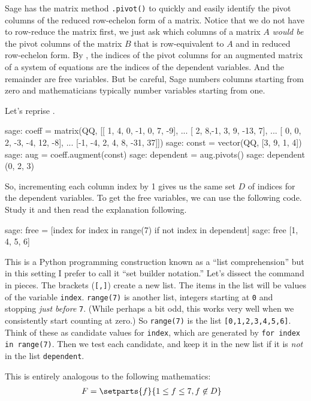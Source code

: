 Sage has the matrix method \verb?.pivot()? to quickly and easily identify the pivot columns of the reduced row-echelon form of a matrix.  Notice that we do not have to row-reduce the matrix first, we just ask which columns of a matrix $A$ \emph{would be} the pivot columns of the matrix $B$ that is row-equivalent to $A$ and in reduced row-echelon form.  By , the indices of the pivot columns for an augmented matrix of a system of equations are the indices of the dependent variables.  And the remainder are free variables.  But be careful, Sage numbers columns starting from zero and mathematicians typically number variables starting from one.\par
%
Let's reprise .
%
\begin{sageexample}
sage: coeff = matrix(QQ, [[ 1,  4, 0, -1,  0,   7, -9],
...                       [ 2,  8,-1,  3,  9, -13,  7],
...                       [ 0,  0, 2, -3, -4,  12, -8],
...                       [-1, -4, 2,  4,  8, -31, 37]])
sage: const = vector(QQ, [3, 9, 1, 4])
sage: aug = coeff.augment(const)
sage: dependent = aug.pivots()
sage: dependent
(0, 2, 3)
\end{sageexample}
%
So, incrementing each column index by 1 gives us the same set $D$ of indices for the dependent variables.  To get the free variables, we can use the following code.  Study it and then read the explanation following.
%
\begin{sageexample}
sage: free = [index for index in range(7) if not index in dependent]
sage: free
[1, 4, 5, 6]
\end{sageexample}
%
This is a Python programming construction known as a ``list comprehension'' but in this setting I prefer to call it ``set builder notation.''  Let's dissect the command in pieces.  The brackets (\verb?[,]?) create a new list.  The items in the list will be values of the variable \verb?index?.  \verb?range(7)? is another list, integers starting at \verb?0? and stopping \emph{just before} \verb?7?.  (While perhaps a bit odd, this works very well when we consistently start counting at zero.) So \verb?range(7)? is the list \verb?[0,1,2,3,4,5,6]?.  Think of these as candidate values for \verb?index?, which are generated by \texttt{for index in range(7)}.  Then we test each candidate, and keep it in the new list if it is \emph{not} in the list \verb?dependent?.\par
%
This is entirely analogous to the following mathematics:
%
\begin{align*}
F &= \setparts{f}{1\leq f\leq 7, f\not\in D}
\end{align*}
